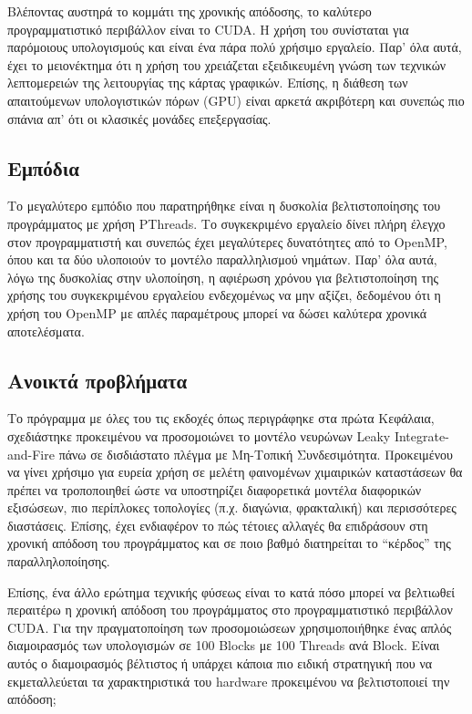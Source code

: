 \documentclass[12pt,a4paper]{article}
\begin{document}
Βλέποντας αυστηρά το κομμάτι της χρονικής απόδοσης, το καλύτερο προγραμματιστικό περιβάλλον είναι το CUDA. Η χρήση του συνίσταται για παρόμοιους υπολογισμούς και είναι ένα πάρα πολύ χρήσιμο εργαλείο. Παρ' όλα αυτά, έχει το μειονέκτημα ότι η χρήση του χρειάζεται εξειδικευμένη γνώση των τεχνικών λεπτομερειών της λειτουργίας της κάρτας γραφικών. Επίσης, η διάθεση των απαιτούμενων υπολογιστικών πόρων (GPU) είναι αρκετά ακριβότερη και συνεπώς πιο σπάνια απ' ότι οι κλασικές μονάδες επεξεργασίας.

\subsection{Εμπόδια}

Το μεγαλύτερο εμπόδιο που παρατηρήθηκε είναι η δυσκολία βελτιστοποίησης του προγράμματος με χρήση PThreads. Το συγκεκριμένο εργαλείο δίνει πλήρη έλεγχο στον προγραμματιστή και συνεπώς έχει μεγαλύτερες δυνατότητες από το OpenMP, όπου και τα δύο υλοποιούν το μοντέλο παραλληλισμού νημάτων. Παρ' όλα αυτά, λόγω της δυσκολίας στην υλοποίηση, η αφιέρωση χρόνου για βελτιστοποίηση της χρήσης του συγκεκριμένου εργαλείου ενδεχομένως να μην αξίζει, δεδομένου ότι η χρήση του OpenMP με απλές παραμέτρους μπορεί να δώσει καλύτερα χρονικά αποτελέσματα.

\subsection{Ανοικτά προβλήματα}

Το πρόγραμμα με όλες του τις εκδοχές όπως περιγράφηκε στα πρώτα Κεφάλαια, σχεδιάστηκε προκειμένου να προσομοιώνει το μοντέλο νευρώνων Leaky Integrate-and-Fire πάνω σε δισδιάστατο πλέγμα με Μη-Τοπική Συνδεσιμότητα. Προκειμένου να γίνει χρήσιμο για ευρεία χρήση σε μελέτη φαινομένων χιμαιρικών καταστάσεων θα πρέπει να τροποποιηθεί ώστε να υποστηρίζει διαφορετικά μοντέλα διαφορικών εξισώσεων, πιο περίπλοκες τοπολογίες (π.χ. διαγώνια, φρακταλική) \cite{tsigkri-desmedt_multi-leveled_nodate} και περισσότερες διαστάσεις. Επίσης, έχει ενδιαφέρον το πώς τέτοιες αλλαγές θα επιδράσουν στη χρονική απόδοση του προγράμματος και σε ποιο βαθμό διατηρείται το ``κέρδος'' της παραλληλοποίησης.

Επίσης, ένα άλλο ερώτημα τεχνικής φύσεως είναι το κατά πόσο μπορεί να βελτιωθεί περαιτέρω η χρονική απόδοση του προγράμματος στο προγραμματιστικό περιβάλλον CUDA. Για την πραγματοποίηση των προσομοιώσεων χρησιμοποιήθηκε ένας απλός διαμοιρασμός των υπολογισμών σε 100 Blocks με 100 Threads ανά Block. Είναι αυτός ο διαμοιρασμός βέλτιστος ή υπάρχει κάποια πιο ειδική στρατηγική που να εκμεταλλεύεται τα χαρακτηριστικά του hardware προκειμένου να βελτιστοποιεί την απόδοση;
\end{document}
